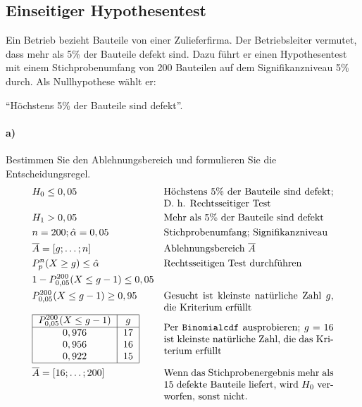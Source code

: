 \documentclass[10pt]{article}
\begin{document}
\subsection{Einseitiger Hypothesentest}
\begin{example}
Ein Betrieb bezieht Bauteile von einer Zulieferfirma. Der Betriebsleiter vermutet,
dass mehr als 5\% der Bauteile defekt sind. Dazu führt er einen Hypothesentest
mit einem Stichprobenumfang von 200 Bauteilen auf dem Signifikanzniveau 5\% durch. Als Nullhypothese wählt er:

\enquote{Höchstens 5\% der Bauteile sind defekt}.
\paragraph{a)} Bestimmen Sie den Ablehnungsbereich und formulieren Sie die Entscheidungsregel.
\addtolength{\jot}{1em}
\begin{align*}
&H_0 \leq 0,05 &\parbox[t]{0.5\linewidth}{Höchstens 5\% der Bauteile sind defekt; D. h. Rechtsseitiger Test} \\
&H_1 > 0,05 &\parbox[t]{0.5\linewidth}{Mehr als 5\% der Bauteile sind defekt} \\
&n = 200; \hat\alpha = 0,05 &\parbox[t]{0.5\linewidth}{Stichprobenumfang; Signifikanzniveau} \\
&\overline A = [g;\dots;n] &\parbox[t]{0.5\linewidth}{Ablehnungsbereich $\overline A$} \\
&P^n_p(X \geq g) \leq \hat\alpha &\parbox[t]{0.5\linewidth}{Rechtsseitigen Test durchführen} \\
&1 - P^{200}_{0,05}(X \leq g - 1) \leq 0,05 &\parbox[t]{0.5\linewidth}{} \\
&P^{200}_{0,05}(X \leq g - 1) \geq 0,95 &\parbox[t]{0.5\linewidth}{Gesucht ist kleinste natürliche Zahl $g$, die Kriterium erfüllt} \\
& \begin{tabular}{|c|c|}
	\hline
	$P^{200}_{0,05}(X \leq g - 1)$ & $g$ \\ \hline
	$0,976$ & $17$ \\
	$0,956$ & $16$ \\
	$0,922$ & $15$ \\
	\hline
	\end{tabular} &\parbox{0.5\linewidth}{Per \texttt{Binomialcdf} ausprobieren; $g = 16$ ist kleinste natürliche Zahl, die das Kriterium erfüllt}\\
&\overline A = [16;\dots;200] &\parbox[t]{0.5\linewidth}{Wenn das Stichprobenergebnis mehr als $15$ defekte Bauteile liefert, wird $H_0$ verworfen, sonst nicht.} \\
\end{align*}

\end{example}
\end{document}
